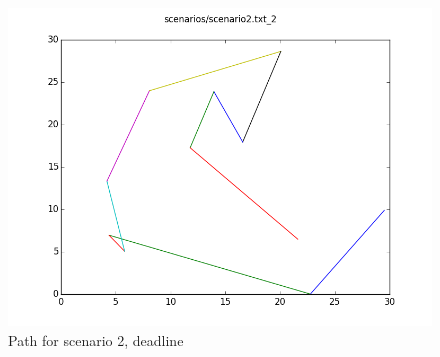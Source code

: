 \documentclass[paper=a4, fontsize=11pt]{scrartcl} %
\numberwithin{equation}{section} %
\numberwithin{figure}{section} %
\numberwithin{table}{section} %
\begin{document}
\begin{figure}[H]
	\centering
  \includegraphics[width=1\textwidth]{results/2_2.png}
	\caption{Path for scenario 2, deadline}
\end{figure}
\end{document}
